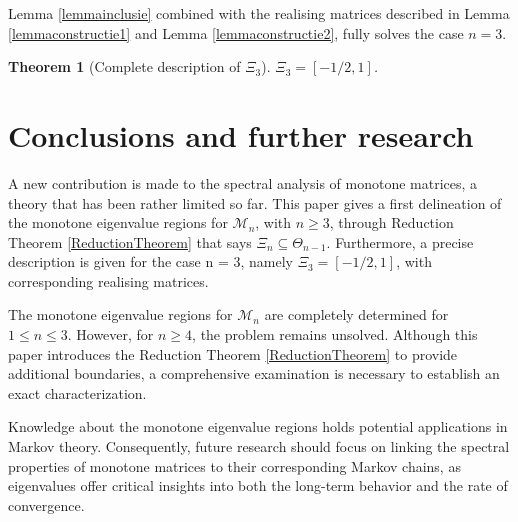 \documentclass[11pt,a4paper]{article}
\newtheorem{theorem}{Theorem}[section]
\theoremstyle{definition}
\theoremstyle{remark}
\begin{document}
Lemma \ref{lemmainclusie} combined with the realising matrices described in Lemma \ref{lemmaconstructie1} and Lemma \ref{lemmaconstructie2}, fully solves the case \(n=3\).

\begin{theorem}[Complete description of \(\Xi_3\)]
    \(\Xi_3 = [-1/2, 1]\).
\end{theorem}


\section{Conclusions and further research}\label{Conclusions and further research}

A new contribution is made to the spectral analysis of monotone matrices, a theory that has been rather limited so far. This paper gives a first delineation of the monotone eigenvalue regions for \(\mathcal{M}_n\), with \(n \geq 3\), through Reduction Theorem \ref{ReductionTheorem} that says \(\Xi_{n} \subseteq \Theta_{n-1} \). Furthermore, a precise description is given for the case n = 3, namely \( \Xi_3 = [-1/2, 1]\), with corresponding realising matrices.

The monotone eigenvalue regions for \(\mathcal{M}_n\) are completely determined for \(1 \leq n \leq 3\). However, for \(n \geq 4\), the problem remains unsolved. Although this paper introduces the Reduction Theorem \ref{ReductionTheorem} to provide additional boundaries, a comprehensive examination is necessary to establish an exact characterization.

Knowledge about the monotone eigenvalue regions holds potential applications in Markov theory. Consequently, future research should focus on linking the spectral properties of monotone matrices to their corresponding Markov chains, as eigenvalues offer critical insights into both the long-term behavior and the rate of convergence.


\end{document}
